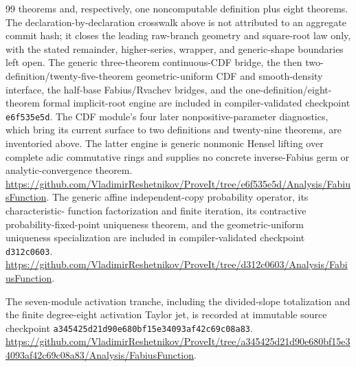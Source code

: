 \documentclass[11pt,oneside]{article}
\theoremstyle{definition}
\theoremstyle{remark}
\begin{document}
\begin{thebibliography}{99}
theorems and, respectively, one noncomputable definition plus eight theorems.  The
declaration-by-declaration crosswalk above is not attributed to an aggregate commit
hash; it closes the leading raw-branch geometry and square-root law only, with the
stated remainder, higher-series, wrapper, and generic-shape boundaries left open.
\newblock The generic three-theorem continuous-CDF bridge, the then
two-definition/twenty-five-theorem geometric-uniform CDF and smooth-density interface,
the half-base Fabius/Rvachev bridges, and the one-definition/eight-theorem formal
implicit-root engine are included in compiler-validated checkpoint
\texttt{e6f535e5d}.  The CDF module's four later nonpositive-parameter diagnostics,
which bring its current surface to two definitions and twenty-nine theorems, are
inventoried above.  The latter engine is generic nonmonic Hensel
lifting over complete adic commutative rings and supplies no concrete inverse-Fabius germ
or analytic-convergence theorem.
\newblock \url{https://github.com/VladimirReshetnikov/ProveIt/tree/e6f535e5d/Analysis/FabiusFunction}.
\newblock The generic affine independent-copy probability operator, its characteristic-
function factorization and finite iteration, its contractive probability-fixed-point
uniqueness theorem, and the geometric-uniform uniqueness specialization are included in
compiler-validated checkpoint \texttt{d312c0603}.
\newblock \url{https://github.com/VladimirReshetnikov/ProveIt/tree/d312c0603/Analysis/FabiusFunction}.

\newblock The seven-module activation tranche, including the divided-slope totalization and
the finite degree-eight activation Taylor jet, is recorded at immutable source checkpoint
\nolinkurl{a345425d21d90e680bf15e34093af42c69c08a83}.
\newblock \url{https://github.com/VladimirReshetnikov/ProveIt/tree/a345425d21d90e680bf15e34093af42c69c08a83/Analysis/FabiusFunction}.

\end{thebibliography}
\end{document}
